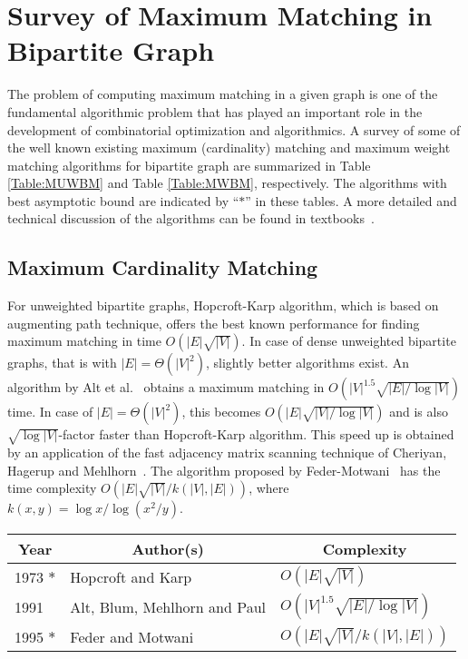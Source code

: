 \documentclass[runningheads,a4paper]{llncs}
\begin{document}
\section[Survey of Maximum Matching in Bipartite Graph]{Survey of Maximum Matching in Bipartite Graph}
\label{mwbm:Survey}
The problem of computing maximum matching in a given graph is one of
the fundamental algorithmic problem that has played an important role
in the development of combinatorial optimization and algorithmics.
A survey of some of the well known existing maximum (cardinality) matching and maximum weight  matching algorithms for bipartite graph are summarized in
Table \ref{Table:MUWBM}  and Table \ref{Table:MWBM}, respectively.
The algorithms with best asymptotic bound are indicated by ``$*$''
in these tables. A more detailed and technical discussion of the algorithms can be found
in textbooks~\cite{korte07,schrijver03,douglas00}.

\subsection{Maximum Cardinality Matching}
For unweighted bipartite graphs, Hopcroft-Karp \cite{hopcroft73}
algorithm, which is based on augmenting path technique, offers
the best known performance for finding maximum matching in time
$O(|E|\sqrt{|V|})$. In case of dense unweighted bipartite graphs, that is with
$|E|=\Theta (|V|^2)$, slightly better algorithms exist.
An algorithm by Alt et al.~\cite{alt91} obtains a maximum matching in
$O(|V|^{1.5}\sqrt{ |E|/\log |V|})$ time. In case of $|E|=\Theta (|V|^2)$, this
becomes $O(|E|{\sqrt{|V|/\log |V|}})$ and is also 
${\sqrt{\log |V|}}$-factor
faster than Hopcroft-Karp algorithm. This speed up is obtained by an
application of the fast adjacency matrix scanning technique of Cheriyan,
Hagerup and Mehlhorn~\cite{cheriyan90}. The algorithm proposed by Feder-Motwani~\cite{feder95} has the time complexity 
$O(|E|\sqrt{|V|}/k(|V|,|E|))$, where
$k(x,y)={\log x} /\log(x^2/y)$.
\vfill
\begin{table*}[htpb]\centering
\caption{Complexity survey of maximum unweighted bipartite matching algorithms.}
\label{Table:MUWBM}
\begin{tabular}{|l|l|l|} 	\hline
\multicolumn{1}{|c|}{\bf Year}	& \multicolumn{1}{|c|}{\bf Author(s)}	& \multicolumn{1}{|c|}{\bf Complexity}\\
\hline
1973 $*$ & Hopcroft and Karp \cite{hopcroft73}  		& $O(|E|\sqrt{|V|})$	\\
\hline
1991 & Alt, Blum, Mehlhorn and Paul \cite{alt91} 	& $O(|V|^{1.5}\sqrt{ |E|/\log |V|})$ \\
\hline
1995 $*$ &Feder and Motwani \cite{feder95}	  		& $O(|E|\sqrt{|V|}/k(|V|,|E|))$ \\
\hline
\end{tabular}
\end{table*}
\end{document}
